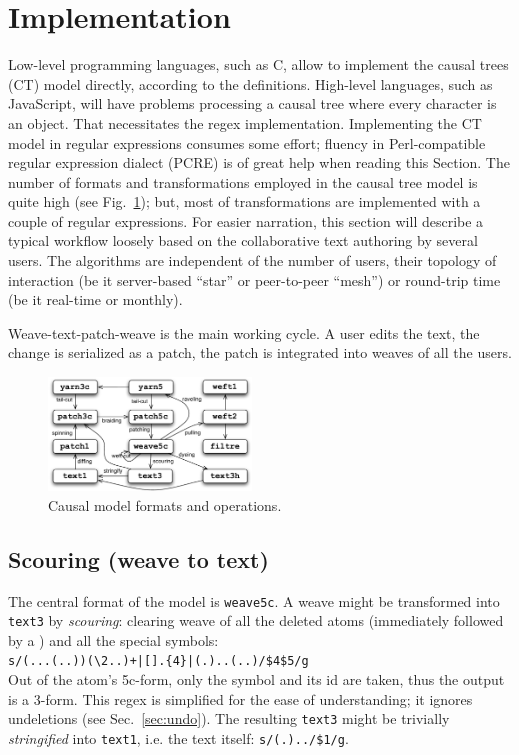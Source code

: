 \documentclass{sig-alternate}
\begin{document}
\section{Implementation}	   \label{sec:algos}

Low-level programming languages, such as C, allow to implement the  causal trees (CT) model directly, according to the definitions.
High-level languages, such as JavaScript, will have problems processing a causal tree where every character is an object.
That necessitates the regex implementation.
Implementing the CT model in regular expressions consumes some effort; fluency in Perl-compatible regular expression dialect (PCRE) is of great help when reading this Section. 
The number of formats and transformations employed in the causal tree model is quite high (see Fig.~\ref{fig:ops}); but, most of transformations are implemented with a couple of regular expressions. 
For easier narration, this section will describe a typical workflow loosely based on the collaborative text authoring by several users. The algorithms are independent of the number of users, their topology of interaction (be it server-based ``star'' or peer-to-peer ``mesh'') or round-trip time (be it real-time or monthly).

Weave-text-patch-weave is the main working cycle. A user edits the text, the change is serialized as a patch, the patch is integrated into weaves of all the users. 

\begin{figure}[t] \label{fig:ops}
\includegraphics[width=0.48\textwidth]{operations.pdf}
\caption{Causal model formats and operations.} \label{fig:ops}
\end{figure}

\subsection{Scouring (weave to text)}
The central format of the model is {\tt weave5c}.
A weave might be transformed into {\tt text3} by \emph{scouring}: clearing weave of all the deleted atoms (immediately followed by a \bsp) and all the special symbols: \\
{\small \verb`s/(...(..))(`\bsp\verb`\2..)+|[`\bsp\zero\cnc\verb`].{4}|(.)..(..)/$4$5/g`}\\
Out of the atom's 5c-form, only the symbol and its id are taken, thus the output is a 3-form.
This regex is simplified for the ease of understanding; it ignores undeletions (see Sec.~\ref{sec:undo}).
The resulting {\tt text3} might be trivially \emph{stringified} into {\tt text1}, i.e. the text itself: {\small \verb+s/(.)../$1/g+}.
\end{document}
